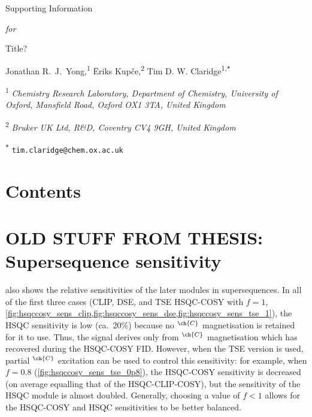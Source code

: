 \documentclass[a4paper,12pt]{article}
\newcommand{\me}{Jonathan R.\ J.\ Yong}
\newcommand{\eriks}{{\=E}riks Kup{\v{c}}e}
\newcommand{\tim}{Tim D. W. Claridge}
\newcommand{\articletitle}{\todo{Title?}}
\newcommand{\crl}{Chemistry Research Laboratory, Department of Chemistry, University of Oxford, Mansfield Road, Oxford OX1 3TA, United Kingdom}
\newcommand{\brukeruk}{Bruker UK Ltd, R\&D, Coventry CV4 9GH, United Kingdom}
\newcommand{\magn}[1]{\ch{^1H}$^{\ch{#1}}$}
\newcommand{\todo}[1]{{\color{OrangeRed}#1}}
\begin{document}
\clearpage
\begin{refsection}
\newcommand{\sectionbreak}{\clearpage}
\renewcommand*{\thefigure}{S\arabic{figure}}
\renewcommand*{\thesection}{S\arabic{section}}
\renewcommand*{\thetable}{S\arabic{table}}
\renewcommand*{\thepage}{S\arabic{page}}
\setcounter{page}{1}
\setcounter{figure}{0}
\setcounter{section}{0}
\setcounter{table}{0}
\onehalfspacing

\hspace{0pt}
\vfill
\begin{center}
    \huge
    Supporting Information

    \vspace{0.3cm}

    \textit{for}

    \vspace{0.3cm}

    \articletitle{}

    \vspace{0.6cm}

    \Large \me{},\textsuperscript{1} \eriks{},\textsuperscript{2} \tim{}\textsuperscript{1,\texttt{*}}

    \vspace{0.6cm}

    \large \textsuperscript{1} \textit{\crl{}}

    \textsuperscript{2} \textit{\brukeruk{}}

    \textsuperscript{\texttt{*}} \texttt{tim.claridge@chem.ox.ac.uk}

\end{center}
\vfill

\newpage
\section*{Contents}

\startcontents[si]
\vfill
\hspace{0pt}
\newpage


\section{OLD STUFF FROM THESIS: Supersequence sensitivity}

 also shows the relative sensitivities of the later modules in  supersequences.
In all of the first three cases (CLIP, DSE, and TSE HSQC-COSY with $f = 1$, \cref{fig:hsqccosy_sens_clip,fig:hsqccosy_sens_dse,fig:hsqccosy_sens_tse_1}), the HSQC sensitivity is low (ca.\ 20\%) because no \magn{C} magnetisation is retained for it to use.
Thus, the signal derives only from \magn{C} magnetisation which has recovered during the HSQC-COSY FID.
However, when the TSE version is used, partial \magn{C} excitation can be used to control this sensitivity: for example, when $f = 0.8$ (\cref{fig:hsqccosy_sens_tse_0p8}), the HSQC-COSY sensitivity is decreased (on average equalling that of the HSQC-CLIP-COSY), but the sensitivity of the HSQC module is almost doubled.
Generally, choosing a value of $f < 1$ allows for the HSQC-COSY and HSQC sensitivities to be better balanced.


\end{refsection}
\end{document}
